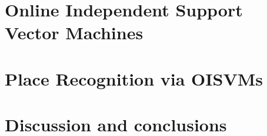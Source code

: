\documentclass{bmvc}
\begin{document}
\section{Online Independent Support Vector Machines}
\label{sec:opt}


\section{Place Recognition via OISVMs}
\label{sec:exp}


\section{Discussion and conclusions}
\label{sec:concl}


{\small


}
\end{document}
